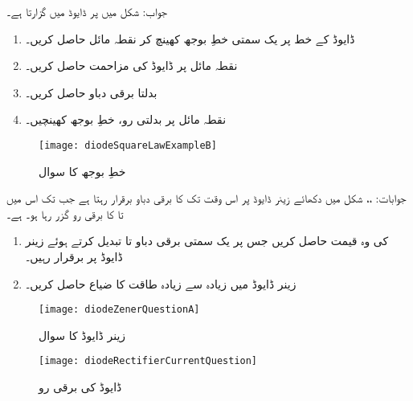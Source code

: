 جواب: 
شکل  میں  پر ڈایوڈ میں  گزارتا ہے۔
\begin{enumerate}
\item
ڈایوڈ کے خط پر یک سمتی خطِ بوجھ کھینچ کر نقطہ مائل حاصل کریں۔
\item
نقطہ مائل پر ڈایوڈ کی مزاحمت  حاصل کریں۔
\item
بدلتا برقی دباو  حاصل کریں۔
\item
نقطہ مائل پر بدلتی رو، خطِ بوجھ کھینچیں۔
\end{enumerate}
\begin{figure}
\centering
\texttt{[image: diodeSquareLawExampleB]}
\caption{خطِ بوجھ کا سوال}
\label{شکل_ڈایوڈ_بار_کے_خط}
\end{figure}

جوابات: ،،  
شکل  میں دکھائے زینر ڈایوڈ پر اس وقت تک  کا برقی دباو برقرار رہتا ہے  جب تک اس میں  تا  کا برقی رو گزر رہا ہو۔ ہے۔
\begin{enumerate}
\item
{} کی وہ قیمت حاصل کریں جس پر یک سمتی برقی دباو  تا  تبدیل کرتے ہوئے  زینر ڈایوڈ پر  برقرار رہیں۔
\item
زینر ڈایوڈ میں زیادہ سے زیادہ طاقت کا ضیاع حاصل کریں۔
\end{enumerate}
%
\begin{figure}
\centering
\texttt{[image: diodeZenerQuestionA]}
\caption{زینر ڈایوڈ کا سوال}
\label{شکل_زینر_ڈایوڈ_سوال_الف}
\end{figure}
%
\begin{figure}
\centering
\texttt{[image: diodeRectifierCurrentQuestion]}
\caption{ڈایوڈ کی برقی رو}
\label{شکل_ڈایوڈ_برقی_رو}
\end{figure}

